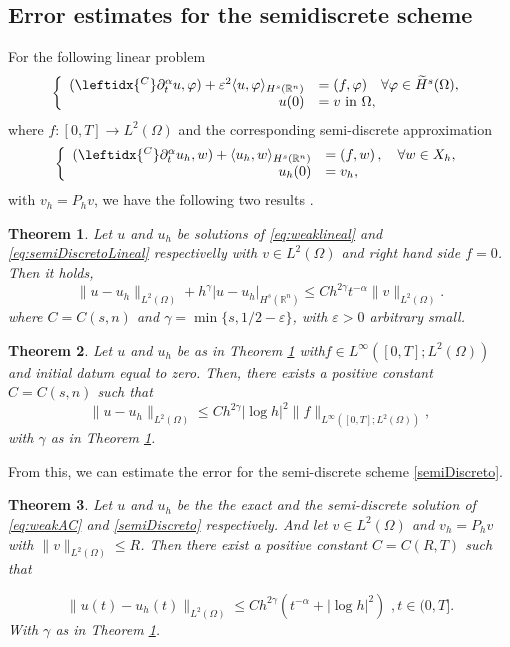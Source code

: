 \documentclass{amsart}
\newcommand{\rn}{{\mathbb{R}^n}}
\newcommand{\phii}{\varphi}
\newcommand{\ele}{L^2(\Omega)}
\newcommand{\ppa}{\leftidx{^C}\partial_t^\alpha}
\newcommand{\W}{\Omega}
\newcommand{\eps}{\varepsilon}
\newcommand{\hsT}{\widetilde{H}^s (\W)}
\newtheorem{theorem}{Theorem}[section]
\theoremstyle{remark}
\theoremstyle{definition}
\numberwithin{equation}{section}
\begin{document}
\subsection{Error estimates for the semidiscrete scheme}
For the following linear problem
\begin{equation}
\label{eq:weaklineal}
\left\lbrace
  \begin{array}{rl}      
 (\ppa u,\phii) + \eps^2\langle u , \phii \rangle_{H^s(\rn)}  & = (f,\phii) \quad \forall \phii \in \hsT, \\
 u(0)  & = v  \text{ in } \Omega, 
\end{array}
    \right.
\end{equation}
where $f:[0,T]\to L^2(\Omega)$ and the corresponding
semi-discrete approximation
\begin{equation} 
\label{eq:semiDiscretoLineal}
\left\lbrace
  \begin{array}{rl}
      ( \ppa u_h  , w )  +  \langle u_h, w \rangle_{H^s(\rn)} & =  \left( f, w \right), \quad \forall w \in X_h, \\
      u_h(0) & = v_h ,
      \end{array}
\right.
\end{equation}
with $v_h = P_h v$, we have the following two results \cite{parabolico}.

\begin{theorem} \label{teo:semi}
Let $u$ and $u_h$ be solutions of \eqref{eq:weaklineal}
and \eqref{eq:semiDiscretoLineal} respectivelly with $v \in \ele$ and right hand side $f = 0$. Then it holds, 
$$
\|u - u_h \|_{L^2(\W)} + h^{\gamma}|u - u_h |_{H^s(\rn)} \leq  C h^{2 \gamma} t^{-\alpha } \|v\|_{\ele}.
$$
where  $C = C(s,n)$ and $\gamma = \min \{ s, 1/2 - \eps\}$, with $\eps > 0$ arbitrary small.
\end{theorem}

\begin{theorem}
\label{estNoHom}
Let $u$ and $u_h$ be as in Theorem \ref{teo:semi} with$f \in L^{\infty}( [0,T] ; L^2(\W) )$ and initial datum equal to zero. Then, there exists a positive constant $C = C(s,n)$ such that
$$
\|u - u_h \|_{L^2(\W)} \leq  C h^{2 \gamma } |\log h|^2 \|f\|_{ L^{\infty}( [0,T] ; L^2(\W) )},
$$ 
with $\gamma$ as in Theorem \ref{teo:semi}.
\end{theorem}

From this, we can estimate the error for the semi-discrete scheme \eqref{semiDiscreto}. 

\begin{theorem}
\label{teo:errorAC}
Let $u$ and $u_h$ be the the exact and the semi-discrete solution of \eqref{eq:weakAC} and \eqref{semiDiscreto} respectively. And let $v \in L^2(\Omega)$ and $v_h = P_hv$ with $\|v\|_{L^2(\Omega)}\leq R$. Then there exist a positive constant $C=C( R , T )$ such that   

\begin{equation}
\|u(t) - u_h(t)\|_{L^2(\Omega)} \leq Ch^{2\gamma}(t^{-\alpha} + |\log{h}|^2 ) \,\, , t\in (0,T].
\label{eq:errorCAC}
\end{equation}
With $\gamma$ as in Theorem \ref{teo:semi}.
 
\end{theorem}
\end{document}
